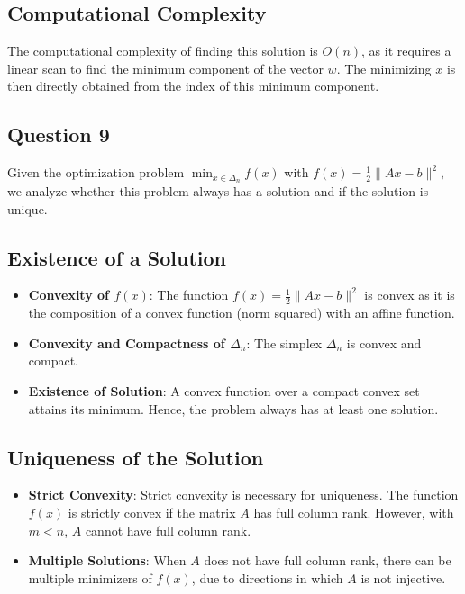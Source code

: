 \documentclass[12p]{article}
\begin{document}
\subsection*{Computational Complexity}
The computational complexity of finding this solution is \( O(n) \), as it requires a linear scan to find the minimum component of the vector \( w \). The minimizing \( x \) is then directly obtained from the index of this minimum component.


\subsection*{Question 9} 

Given the optimization problem \( \min_{x \in \Delta_n} f(x) \) with \( f(x) = \frac{1}{2} \|Ax - b\|^2 \), we analyze whether this problem always has a solution and if the solution is unique.

\subsection*{Existence of a Solution}
\begin{itemize}
    \item \textbf{Convexity of \( f(x) \)}: The function \( f(x) = \frac{1}{2} \|Ax - b\|^2 \) is convex as it is the composition of a convex function (norm squared) with an affine function.
    \item \textbf{Convexity and Compactness of \( \Delta_n \)}: The simplex \( \Delta_n \) is convex and compact.
    \item \textbf{Existence of Solution}: A convex function over a compact convex set attains its minimum. Hence, the problem always has at least one solution.
\end{itemize}

\subsection*{Uniqueness of the Solution}
\begin{itemize}
    \item \textbf{Strict Convexity}: Strict convexity is necessary for uniqueness. The function \( f(x) \) is strictly convex if the matrix \( A \) has full column rank. However, with \( m < n \), \( A \) cannot have full column rank.
    \item \textbf{Multiple Solutions}: When \( A \) does not have full column rank, there can be multiple minimizers of \( f(x) \), due to directions in which \( A \) is not injective.
\end{itemize}
\end{document}
